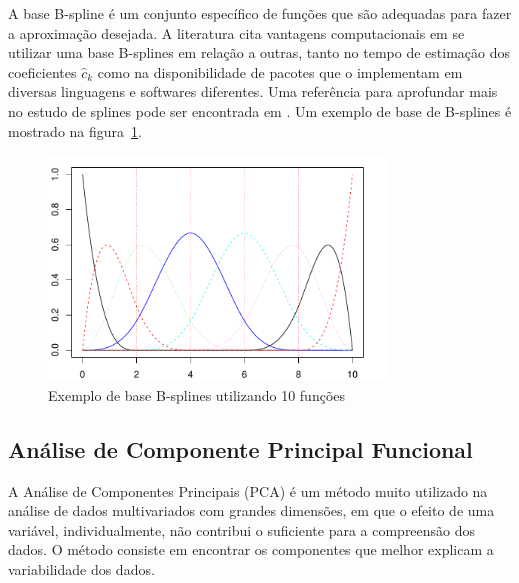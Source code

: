 \documentclass[
	12pt,				%
	openright,			%
	oneside,			%
	a4paper,			%
	english,			%
	brazil				%
	]{dissertacao-ufrgs-abntex2}
\begin{document}
A base B-spline é um conjunto específico de funções que são adequadas para fazer a aproximação desejada.
A literatura cita vantagens computacionais em se utilizar uma base B-splines em relação a outras, tanto no tempo de estimação dos coeficientes $\hat{c}_k$ como na disponibilidade de pacotes que o implementam em diversas linguagens e softwares diferentes.
Uma referência para aprofundar mais no estudo de splines pode ser encontrada em . Um exemplo de base de B-splines é mostrado na figura~\ref{fig:base-bspline}.
\begin{figure}[h!] 
  \centering
    \includegraphics[width=0.8\textwidth]{anexos/base_bsplines1}
  \caption{Exemplo de base B-splines utilizando 10 funções}
  \label{fig:base-bspline}
\end{figure}

\subsection{Análise de Componente Principal Funcional}
\label{FPCA}

A Análise de Componentes Principais (PCA) é um método muito utilizado na análise de dados multivariados com grandes dimensões, em que o efeito de uma variável, individualmente, não contribui o suficiente para a compreensão dos dados. O método consiste em encontrar os componentes que melhor explicam a variabilidade dos dados. 
\end{document}
